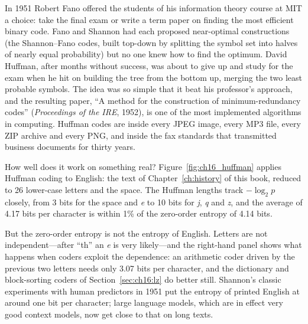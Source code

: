 
\begin{history}
In 1951 Robert Fano offered the students of his information theory course at MIT a choice: take the
final exam or write a term paper on finding the most efficient binary code. Fano and Shannon had
each proposed near-optimal constructions (the Shannon--Fano codes, built top-down by splitting the
symbol set into halves of nearly equal probability) but no one knew how to find the optimum. David
Huffman, after months without success, was about to give up and study for the exam when he hit on
building the tree from the bottom up, merging the two least probable symbols. The idea was so
simple that it beat his professor's approach, and the resulting paper, ``A method for the
construction of minimum-redundancy codes'' (\emph{Proceedings of the IRE}, 1952), is one of the
most implemented algorithms in computing. Huffman codes are inside every JPEG image, every MP3 file,
every ZIP archive and every PNG, and inside the fax standards that transmitted business documents
for thirty years.
\end{history}

How well does it work on something real? Figure~\ref{fig:ch16_huffman} applies Huffman coding to
English: the text of Chapter~\ref{ch:history} of this book, reduced to 26 lower-case letters and
the space. The Huffman lengths track $-\log_2 p$ closely, from 3 bits for the space and \emph{e}
to 10 bits for \emph{j}, \emph{q} and \emph{z}, and the average of 4.17 bits per character is
within 1\% of the zero-order entropy of 4.14 bits.

But the zero-order entropy is not the entropy of English. Letters are not independent---after
``th'' an \emph{e} is very likely---and the right-hand panel shows what happens when coders exploit
the dependence: an arithmetic coder driven by the previous two letters needs only 3.07 bits per
character, and the dictionary and block-sorting coders of Section~\ref{sec:ch16:lz} do better
still. Shannon's classic experiments with human predictors in 1951 put the entropy of printed
English at around one bit per character; large language models, which are in effect very good
context models, now get close to that on long texts.

